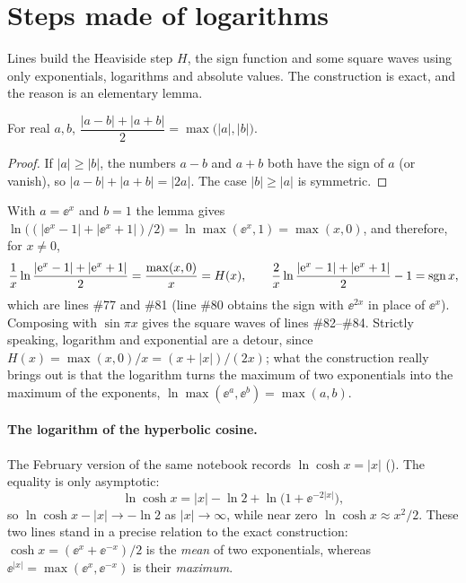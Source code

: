\section{Steps made of logarithms}
\label{sec:gradini}

Lines  build the Heaviside step $H$, the sign
function and some square waves using only exponentials, logarithms and
absolute values. The construction is exact, and the reason is an elementary
lemma.

\begin{lemma}\label{lemma:massimo}
For real $a,b$,
$\dfrac{|a-b|+|a+b|}{2}=\max\bigl(|a|,|b|\bigr)$.
\end{lemma}

\begin{proof}
If $|a|\ge|b|$, the numbers $a-b$ and $a+b$ both have the sign of $a$ (or
vanish), so $|a-b|+|a+b|=|2a|$. The case $|b|\ge|a|$ is symmetric.
\end{proof}

With $a=\ee^{x}$ and $b=1$ the lemma gives
$\ln\bigl((|\ee^x-1|+|\ee^x+1|)/2\bigr)=\ln\max(\ee^x,1)=\max(x,0)$, and
therefore, for $x\neq0$,
\[
  \frac{1}{x}\ln\frac{|\mathrm{e}^x-1|+|\mathrm{e}^x+1|}{2}=\frac{\max(x,0)}{x}=H(x),
  \qquad
  \frac{2}{x}\ln\frac{|\mathrm{e}^x-1|+|\mathrm{e}^x+1|}{2}-1=\operatorname{sgn} x ,
\]
which are lines \#77 and \#81 (line \#80 obtains the sign with $\ee^{2x}$ in
place of $\ee^{x}$). Composing with $\sin\pi x$ gives the square waves of
lines \#82--\#84. Strictly speaking, logarithm and exponential are a detour,
since $H(x)=\max(x,0)/x=(x+|x|)/(2x)$; what the construction really brings
out is that the logarithm turns the maximum of two exponentials into the
maximum of the exponents, $\ln\max(\ee^{a},\ee^{b})=\max(a,b)$.

\paragraph{The logarithm of the hyperbolic cosine.}
The February version of the same notebook records $\ln\cosh x=|x|$
(). The equality is only asymptotic:
\[
  \ln\cosh x=|x|-\ln2+\ln\bigl(1+\ee^{-2|x|}\bigr),
\]
so $\ln\cosh x-|x|\to-\ln2$ as $|x|\to\infty$, while near zero
$\ln\cosh x\approx x^2/2$. These two lines stand in a precise relation to the
exact construction: $\cosh x=(\ee^{x}+\ee^{-x})/2$ is the \emph{mean} of two
exponentials, whereas $\ee^{|x|}=\max(\ee^{x},\ee^{-x})$ is their
\emph{maximum}.

